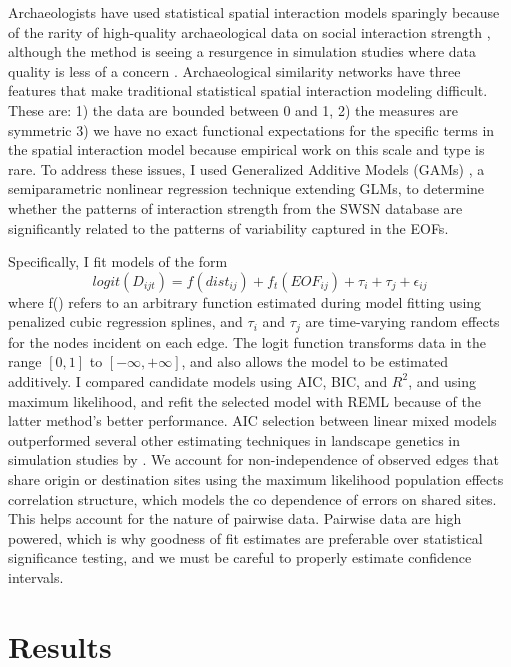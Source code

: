 \documentclass[10pt]{iopart}
\begin{document}
Archaeologists have used statistical spatial interaction models sparingly \parencite{Tobler1971,Hodder1974,Johnson1990ChumashAnalysis} because of the rarity of high-quality archaeological data on social interaction strength \parencite{plogg?}, although the method is seeing a resurgence in simulation studies where data quality is less of a concern \parencite{Bevan2013, Evans2011, Davies2014,Paliou2016}. Archaeological similarity networks have three features that make traditional statistical spatial interaction modeling difficult. These are: 1) the data are bounded between 0 and 1, 2) the measures are symmetric 3) we have no exact functional expectations for the specific terms in the spatial interaction model because empirical work on this scale and type is rare. To address these issues, I used Generalized Additive Models (GAMs) \parencite{Wood2006a}, a semiparametric nonlinear regression technique extending GLMs, to determine whether the patterns of interaction strength from the SWSN database are significantly related to the patterns of variability captured in the EOFs. 

Specifically, I fit models of the form
\begin{equation}
    logit\left(D_{ijt}\right) = f(dist_{ij}) + f_t(EOF_{ij}) + \tau_i + \tau_j + \epsilon_{ij}
\end{equation}
where f() refers to an arbitrary function estimated during model fitting using penalized cubic regression splines, and $\tau_i$ and $\tau_j$ are time-varying random effects for the nodes incident on each edge. The logit function transforms data in the range $[0, 1]$ to $[-\infty, +\infty]$, and also allows the model to be estimated additively. I compared candidate models using AIC, BIC, and $R^2$, and using maximum likelihood, and refit the selected model with REML because of the latter method's better performance. AIC selection between linear mixed models outperformed several other estimating techniques in landscape genetics in simulation studies by \parencite{Shirk2018}. We account for non-independence of observed edges that share origin or destination sites using the maximum likelihood population effects correlation structure, which models the co dependence of errors on shared sites. This helps account for the nature of pairwise data. Pairwise data are high powered, which is why goodness of fit estimates are preferable over statistical significance testing, and we must be careful to properly estimate confidence intervals. 

\section*{Results}
\end{document}
